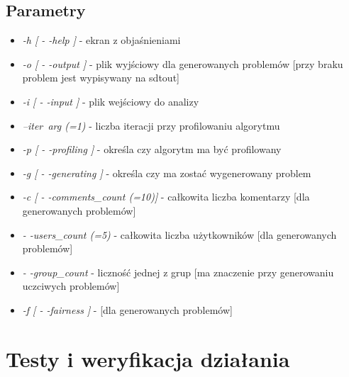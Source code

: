 \documentclass[11pt]{article}
\newcommand{\+}{\discretionary{\mbox{\scriptsize$\hookleftarrow$}}{}{}}
\begin{document}
\subsection{Parametry}
\begin{itemize} 
\item
\textit{-h [ - -help ]} - ekran z objaśnieniami
\item
\textit{-o [ - -output ]} - plik wyjściowy dla generowanych problemów [przy braku problem jest wypisywany na sdtout]
\item
\textit{-i [ - -input ] } - plik wejściowy do analizy   
\item
\textit{--iter\ arg (=1)} - liczba iteracji przy profilowaniu algorytmu
\item
\textit{-p [ - -profiling ]} - określa czy algorytm ma być profilowany
\item
\textit{-g [ - -generating ]} - określa czy ma zostać wygenerowany problem
\item
\textit{-c [ - -comments\_count (=10)]} - całkowita liczba komentarzy [dla generowanych problemów]
\item
\textit{- -users\_count (=5) } - całkowita liczba użytkowników [dla generowanych problemów]
\item
\textit{- -group\_count} - liczność jednej z grup [ma znaczenie przy generowaniu uczciwych problemów]
\item
\textit{-f [ - -fairness ]} - [dla generowanych problemów]
\end{itemize}
\section{Testy i weryfikacja działania}
\end{document}
